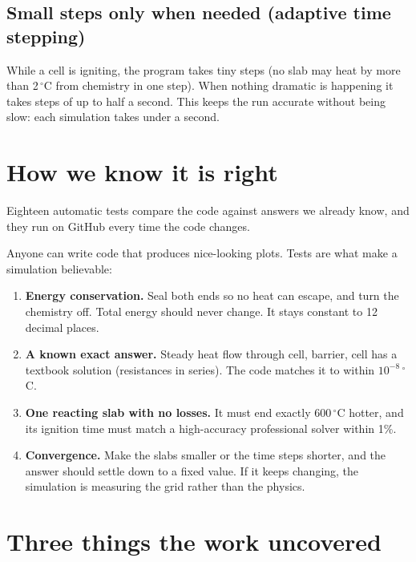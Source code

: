 \documentclass[11pt]{article}
\begin{document}
\subsection*{Small steps only when needed (adaptive time stepping)}

While a cell is igniting, the program takes tiny steps (no slab may heat by more than
2\,$^\circ$C from chemistry in one step). When nothing dramatic is happening it takes steps
of up to half a second. This keeps the run accurate without being slow: each simulation
takes under a second.

\section{How we know it is right}

\begin{idea}
Eighteen automatic tests compare the code against answers we already know, and they run
on GitHub every time the code changes.
\end{idea}

Anyone can write code that produces nice-looking plots. Tests are what make a simulation
believable:

\begin{enumerate}
  \item \textbf{Energy conservation.} Seal both ends so no heat can escape, and turn the
        chemistry off. Total energy should never change. It stays constant to 12 decimal
        places.
  \item \textbf{A known exact answer.} Steady heat flow through cell, barrier, cell has a
        textbook solution (resistances in series). The code matches it to within
        $10^{-8}$\,$^\circ$C.
  \item \textbf{One reacting slab with no losses.} It must end exactly 600\,$^\circ$C hotter,
        and its ignition time must match a high-accuracy professional solver within 1\%.
  \item \textbf{Convergence.} Make the slabs smaller or the time steps shorter, and the
        answer should settle down to a fixed value. If it keeps changing, the simulation is
        measuring the grid rather than the physics.
\end{enumerate}

\section{Three things the work uncovered}
\end{document}
